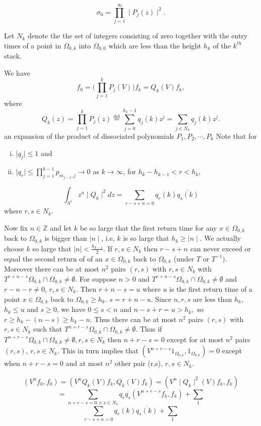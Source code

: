 \documentclass{amsart}
\theoremstyle{definition}
\theoremstyle{remark}
\numberwithin{equation}{section}
\newcommand{\egdef}{\stackrel{\textrm {def}}{=}}
\newcommand{\1}{\mathbb{1}}
\begin{document}
$$\sigma_0 = \prod_{j=1}^\infty\mid P_j(z)\mid^2 .$$



Let $N_k$ denote the the set of integers consisting of zero together with the entry times
of a point in $\Omega_{0,k}$ into $\Omega_{0,0}$ which are less than the height $h_k$ of the $k^{th}$ stack.

We have
 $$f_0 = \Big(\prod_{j=1}^kP_j(V)\Big)f_k = Q_k(V)f_k,$$
where
$$Q_k(z) = \prod_{j=1}^k P_j(z) \egdef \sum_{j=0}^{h_k-1}q_j(k)z^j = \sum_{j \in N_k}q_j(k)z^j.$$
an expansion of the product of dissociated polynomials $P_1, P_2, \cdots, P_k$
Note that for
\begin{enumerate}[(i)]
\item $\mid q_j\mid \leq 1$ and
 \item $\mid q_r\mid \leq  \prod_{j=1}^{k-1} p_{m_{j-1},j} \rightarrow 0$ as $k\rightarrow \infty$, for $ h_k - h_{k-1} < r < h_k$,
\end{enumerate}
$$\int_{S^1}z^{n}\mid Q_k\mid^2dz = \sum_{r-s+n=0}q_r(k)\overline {q_s(k)}$$
where $r,s \in N_k$.

Now fix $n  \in \mathbb Z$ and let $k$ be so large that the first return time for any $x\in \Omega_{0,k}$ back to $\Omega_{0,k}$ is bigger than $\mid n\mid$, i.e, $k$ is so large that
$h_k \geq \mid n\mid$. We actually choose $k$ so large that $\mid n\mid < \frac{h_{k-1}}{2}$. If $r,s \in N_k$ then $r-s+n $ can never exceed or equal the second return of of an $x \in \Omega_{0,k}$ back to $\Omega_{0,k}$ (under $T$ or $T^{-1})$. Moreover there can be at most $n^2$ pairs $(r,s)$ with $r,s \in N_k$ with $T^{r+n-s}\Omega_{0,k}\cap \Omega_{0,k} \neq \emptyset$. For suppose $n >0$ and $T^{r+n-s}\Omega_{0,k}\cap \Omega_{0,k} \neq \emptyset$ and $r-n-r \neq 0$, $r,s \in N_k$. Then $r+n-s=u$ where $u$ is the first return time of a point $x \in \Omega_{0,k}$ back to $\Omega_{0,k} \geq h_k$.
$s =r+n-u$. Since $n,r,s$ are less than $h_k$, $h_k \leq u$ and $s \geq 0$, we have $0 \leq  s <n$ and $n-s +r = u > h_k,$ so $r \geq h_k -(n-s) \geq  h_k -n$. Thus there can be at most $n^2$ pairs $(r,s)$ with $r,s \in N_k$ such that $T^{n+r-s}\Omega_{0,k}\cap\Omega_{0,k} \neq \emptyset$. Thus if $ T^{n+r-s}\Omega_{0,k}\cap \Omega_{0,k} \neq \emptyset, r,s \in N_k$ then $n+r-s =0$ except for at most $n^2$ pairs $(r,s)$, $r,s \in N_k$. This in turn implies that $(V^{n+r-s}1_{\Omega_{0,k}},1_{\Omega_{0,k}}) = 0$ except when $n+r-s =0$  and at
most $n^2$ other pair (r,s), $r,s\in N_k$.

$$(V^nf_0,f_0) = (V^nQ_k(V)f_k,Q_k(V)f_k) = (V^n\mid Q_k\mid^2(V)f_k,f_k)$$
$$=\sum_{n+r-s=0, r,s \in N_k}q_r{\overline {q_s}}(V^{n+r-s}f_k,f_k) + \sum_1$$
$$\sum_{r-s+n=0}q_r(k)\overline {q_s(k)} + \sum_1$$
\end{document}
